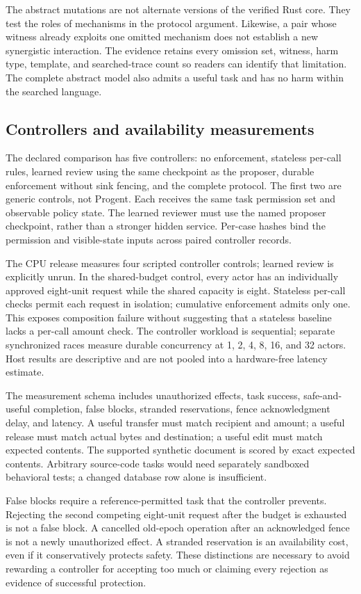 The abstract mutations are not alternate versions of the verified Rust core.
They test the roles of mechanisms in the protocol argument. Likewise, a pair
whose witness already exploits one omitted mechanism does not establish a new
synergistic interaction. The evidence retains every omission set, witness, harm
type, template, and searched-trace count so readers can identify that limitation.
The complete abstract model also admits a useful task and has no harm within
the searched language.

\subsection{Controllers and availability measurements}
The declared comparison has five controllers: no enforcement, stateless per-call
rules, learned review using the same checkpoint as the proposer, durable
enforcement without sink fencing, and the complete protocol. The first two are
generic controls, not Progent. Each receives the same task permission set and
observable policy state. The learned reviewer must use the named proposer
checkpoint, rather than a stronger hidden service. Per-case hashes bind the
permission and visible-state inputs across paired controller records.

The CPU release measures four scripted controller controls; learned review is
explicitly unrun. In the shared-budget control, every actor has an individually
approved eight-unit request while the shared capacity is eight. Stateless
per-call checks permit each request in isolation; cumulative enforcement admits
only one. This exposes composition failure without suggesting that a stateless
baseline lacks a per-call amount check. The controller workload is sequential;
separate synchronized races measure durable concurrency at 1, 2, 4, 8, 16, and
32 actors. Host results are descriptive and are not pooled into a hardware-free
latency estimate.

The measurement schema includes unauthorized effects, task success,
safe-and-useful completion, false blocks, stranded reservations, fence
acknowledgment delay, and latency. A useful transfer must match recipient and
amount; a useful release must match actual bytes and destination; a useful edit
must match expected contents. The supported synthetic document is scored by
exact expected contents. Arbitrary source-code tasks would need separately
sandboxed behavioral tests; a changed database row alone is insufficient.

False blocks require a reference-permitted task that the controller prevents.
Rejecting the second competing eight-unit request after the budget is exhausted
is not a false block. A cancelled old-epoch operation after an acknowledged fence
is not a newly unauthorized effect. A stranded reservation is an availability
cost, even if it conservatively protects safety. These distinctions are necessary
to avoid rewarding a controller for accepting too much or claiming every
rejection as evidence of successful protection.

